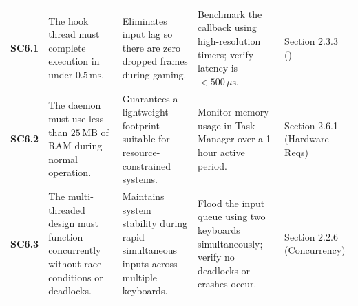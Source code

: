 {\begin{xltabular}{\textwidth}{@{} l P{3.0cm} L L P{2.2cm} @{}}
			\textbf{SC6.1} &
			The hook thread must complete execution in under $0.5\,\text{ms}$. &
			Eliminates input lag so there are zero dropped frames during gaming. &
			Benchmark the callback using high-resolution timers; verify latency is $< 500\,\mu\text{s}$. &
			Section 2.3.3 (\stakeholdersPU) \\

			\textbf{SC6.2} &
			The daemon must use less than $25\,\text{MB}$ of RAM during normal operation. &
			Guarantees a lightweight footprint suitable for resource-constrained systems. &
			Monitor memory usage in Task Manager over a 1-hour active period. &
			Section 2.6.1 (Hardware Reqs) \\

			\textbf{SC6.3} &
			The multi-threaded design must function concurrently without race conditions or deadlocks. &
			Maintains system stability during rapid simultaneous inputs across multiple keyboards. &
			Flood the input queue using two keyboards simultaneously; verify no deadlocks or crashes occur. &
			Section 2.2.6 (Concurrency) \\
		\end{xltabular}
	}
